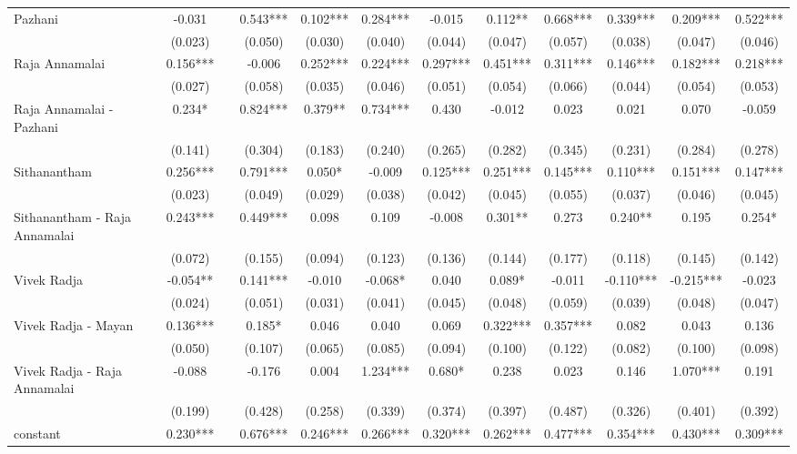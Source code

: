 \begin{table}[htbp]
\begin{tabular}{lccccccccccc}
    Pazhani & -0.031 &   & 0.543*** & 0.102*** & 0.284*** & -0.015 & 0.112** & 0.668*** & 0.339*** & 0.209*** & 0.522*** \\
      & (0.023) &   & (0.050) & (0.030) & (0.040) & (0.044) & (0.047) & (0.057) & (0.038) & (0.047) & (0.046) \\
    Raja Annamalai & 0.156*** &   & -0.006 & 0.252*** & 0.224*** & 0.297*** & 0.451*** & 0.311*** & 0.146*** & 0.182*** & 0.218*** \\
      & (0.027) &   & (0.058) & (0.035) & (0.046) & (0.051) & (0.054) & (0.066) & (0.044) & (0.054) & (0.053) \\
    Raja Annamalai - Pazhani & 0.234* &   & 0.824*** & 0.379** & 0.734*** & 0.430 & -0.012 & 0.023 & 0.021 & 0.070 & -0.059 \\
      & (0.141) &   & (0.304) & (0.183) & (0.240) & (0.265) & (0.282) & (0.345) & (0.231) & (0.284) & (0.278) \\
    Sithanantham & 0.256*** &   & 0.791*** & 0.050* & -0.009 & 0.125*** & 0.251*** & 0.145*** & 0.110*** & 0.151*** & 0.147*** \\
      & (0.023) &   & (0.049) & (0.029) & (0.038) & (0.042) & (0.045) & (0.055) & (0.037) & (0.046) & (0.045) \\
    Sithanantham - Raja Annamalai & 0.243*** &   & 0.449*** & 0.098 & 0.109 & -0.008 & 0.301** & 0.273 & 0.240** & 0.195 & 0.254* \\
      & (0.072) &   & (0.155) & (0.094) & (0.123) & (0.136) & (0.144) & (0.177) & (0.118) & (0.145) & (0.142) \\
    Vivek Radja & -0.054** &   & 0.141*** & -0.010 & -0.068* & 0.040 & 0.089* & -0.011 & -0.110*** & -0.215*** & -0.023 \\
      & (0.024) &   & (0.051) & (0.031) & (0.041) & (0.045) & (0.048) & (0.059) & (0.039) & (0.048) & (0.047) \\
    Vivek Radja - Mayan & 0.136*** &   & 0.185* & 0.046 & 0.040 & 0.069 & 0.322*** & 0.357*** & 0.082 & 0.043 & 0.136 \\
      & (0.050) &   & (0.107) & (0.065) & (0.085) & (0.094) & (0.100) & (0.122) & (0.082) & (0.100) & (0.098) \\
    Vivek Radja - Raja Annamalai & -0.088 &   & -0.176 & 0.004 & 1.234*** & 0.680* & 0.238 & 0.023 & 0.146 & 1.070*** & 0.191 \\
      & (0.199) &   & (0.428) & (0.258) & (0.339) & (0.374) & (0.397) & (0.487) & (0.326) & (0.401) & (0.392) \\
    constant & 0.230*** &   & 0.676*** & 0.246*** & 0.266*** & 0.320*** & 0.262*** & 0.477*** & 0.354*** & 0.430*** & 0.309*** \\

\end{tabular}
\end{table}
